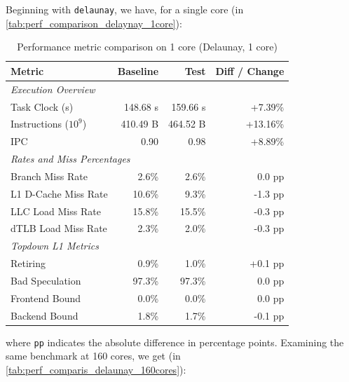 \documentclass[leqno,11pt]{article}
\begin{document}
Beginning with \texttt{delaunay}, we have, for a single core (in \cref{tab:perf_comparison_delaynay_1core}):
    \begin{table}[htbp]
      \centering
      \caption{Performance metric comparison on 1 core (Delaunay, 1 core)}
      \label{tab:perf_comparison_delaunay_1core}
      \begin{tabular}{lrrr}
        \toprule
        \textbf{Metric} & \textbf{Baseline} & \textbf{Test} & \textbf{Diff / Change} \\
        \midrule
        \multicolumn{4}{l}{\textit{Execution Overview}} \\
        \quad Task Clock (s)           & 148.68 s   & 159.66 s   & +7.39\%   \\
        \quad Instructions ($10^9$)    & 410.49 B   & 464.52 B   & +13.16\%  \\
        \quad IPC                      & 0.90       & 0.98       & +8.89\%   \\
        \midrule
        \multicolumn{4}{l}{\textit{Rates and Miss Percentages}} \\
        \quad Branch Miss Rate         & 2.6\%      & 2.6\%      & 0.0 pp    \\
        \quad L1 D-Cache Miss Rate     & 10.6\%     & 9.3\%      & -1.3 pp   \\
        \quad LLC Load Miss Rate       & 15.8\%     & 15.5\%     & -0.3 pp   \\
        \quad dTLB Load Miss Rate      & 2.3\%      & 2.0\%      & -0.3 pp   \\
        \midrule
        \multicolumn{4}{l}{\textit{Topdown L1 Metrics}} \\
        \quad Retiring                 & 0.9\%      & 1.0\%      & +0.1 pp   \\
        \quad Bad Speculation          & 97.3\%     & 97.3\%     & 0.0 pp    \\
        \quad Frontend Bound           & 0.0\%      & 0.0\%      & 0.0 pp    \\
        \quad Backend Bound            & 1.8\%      & 1.7\%      & -0.1 pp   \\
        \bottomrule
      \end{tabular}
    \end{table}
where \texttt{pp} indicates the absolute difference in percentage points.
Examining the same benchmark at 160 cores, we get (in \cref{tab:perf_comparis_delaunay_160cores}):
\end{document}
